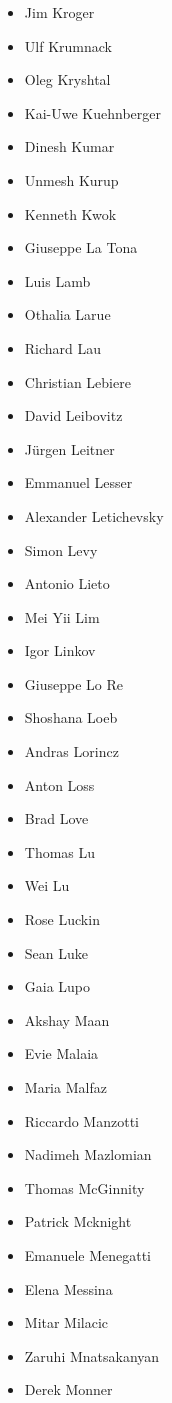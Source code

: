 \documentclass[10pt,fleqn,openany]{book} %
\begin{document}
\begin{multicols}{2}
\begin{itemize}
			\item Jim Kroger
			\item Ulf Krumnack
			\item Oleg Kryshtal
			\item Kai-Uwe Kuehnberger
			\item Dinesh Kumar
			\item Unmesh Kurup
			\item Kenneth Kwok
			\item Giuseppe La Tona
			\item Luis Lamb
			\item Othalia Larue
			\item Richard Lau
			\item Christian Lebiere
			\item David Leibovitz
			\item Jürgen Leitner
			\item Emmanuel Lesser
			\item Alexander Letichevsky
			\item Simon Levy
			\item Antonio Lieto
			\item Mei Yii Lim
			\item Igor Linkov
			\item Giuseppe Lo Re
			\item Shoshana Loeb
			\item Andras Lorincz
			\item Anton Loss
			\item Brad Love
			\item Thomas Lu
			\item Wei Lu
			\item Rose Luckin
			\item Sean Luke
			\item Gaia Lupo
			\item Akshay Maan
			\item Evie Malaia
			\item Maria Malfaz
			\item Riccardo Manzotti
			\item Nadimeh Mazlomian
			\item Thomas McGinnity
			\item Patrick Mcknight
			\item Emanuele Menegatti
			\item Elena Messina
			\item Mitar Milacic
			\item Zaruhi Mnatsakanyan
			\item Derek Monner

\end{itemize}
\end{multicols}
\end{document}
